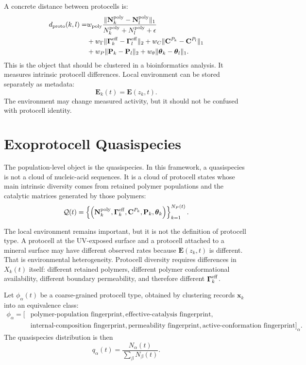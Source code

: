 \documentclass[11pt]{article}
\begin{document}
A concrete distance between protocells is:
\begin{align}
d_{\rm proto}(k,l)
=&
w_{\rm poly}
\frac{
\|\mathbf{N}^{\rm poly}_k-\mathbf{N}^{\rm poly}_l\|_1
}{
N^{\rm poly}_k+N^{\rm poly}_l+\epsilon
}
\nonumber\\
&+
w_\Gamma
\|\boldsymbol{\Gamma}^{\rm eff}_k-\boldsymbol{\Gamma}^{\rm eff}_l\|_2
+
w_C
\|\mathbf{C}^{P_k}-\mathbf{C}^{P_l}\|_1
\nonumber\\
&+
w_P
\|\mathbf{P}_k-\mathbf{P}_l\|_2
+
w_\theta
\|\boldsymbol{\theta}_k-\boldsymbol{\theta}_l\|_1.
\end{align}
This is the object that should be clustered in a bioinformatics analysis. It measures intrinsic protocell differences. Local environment can be stored separately as metadata:
\begin{equation}
\mathbf{E}_k(t)=\mathbf{E}(z_k,t).
\end{equation}
The environment may change measured activity, but it should not be confused with protocell identity.

\section{Exoprotocell Quasispecies}

The population-level object is the quasispecies. In this framework, a quasispecies is not a cloud of nucleic-acid sequences. It is a cloud of protocell states whose main intrinsic diversity comes from retained polymer populations and the catalytic matrices generated by those polymers:
\begin{equation}
\mathcal{Q}(t)
=
\left\{
\left(
\mathbf{N}^{\rm poly}_k,
\boldsymbol{\Gamma}^{\rm eff}_k,
\mathbf{C}^{P_k},
\mathbf{P}_k,
\boldsymbol{\theta}_k
\right)
\right\}_{k=1}^{N_P(t)}.
\end{equation}

The local environment remains important, but it is not the definition of protocell type. A protocell at the UV-exposed surface and a protocell attached to a mineral surface may have different observed rates because $\mathbf{E}(z_k,t)$ is different. That is environmental heterogeneity. Protocell diversity requires differences in $X_k(t)$ itself: different retained polymers, different polymer conformational availability, different boundary permeability, and therefore different $\boldsymbol{\Gamma}^{\rm eff}_k$.

Let $\phi_\alpha(t)$ be a coarse-grained protocell type, obtained by clustering records $\mathbf{x}_k$ into an equivalence class:
\begin{align}
\phi_\alpha
=
\big[
&\text{polymer-population fingerprint},
\text{effective-catalysis fingerprint},
\nonumber\\
&\text{internal-composition fingerprint},
\text{permeability fingerprint},
\text{active-conformation fingerprint}
\big]_\alpha.
\end{align}
The quasispecies distribution is then
\begin{equation}
q_\alpha(t)
=
\frac{N_\alpha(t)}{\sum_\beta N_\beta(t)}.
\end{equation}
\end{document}
